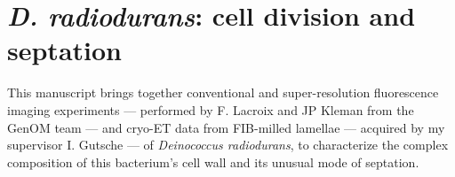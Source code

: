 \chapter{\textit{D. radiodurans}: cell division and septation}\label{drad}

This manuscript brings together conventional and super-resolution fluorescence imaging experiments --- performed by F. Lacroix and JP Kleman from the GenOM team --- and cryo-ET data from FIB-milled lamellae --- acquired by my supervisor I. Gutsche --- of \textit{Deinococcus radiodurans}, to characterize the complex composition of this bacterium's cell wall and its unusual mode of septation.

\localtableofcontents
\newpage

\newpage

